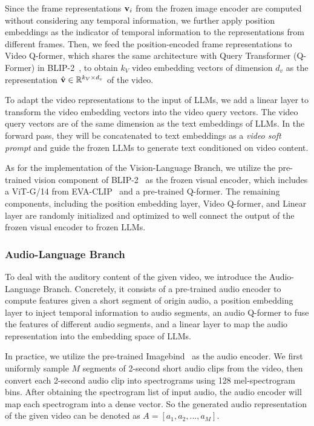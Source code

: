 Since the frame representations $\mathrm{\bf v}_i$ from the frozen image encoder are computed without considering any temporal information, we further apply position embeddings as the indicator of temporal information to the representations from different frames. Then, we feed the position-encoded frame representations to Video Q-former, which shares the same architecture with Query Transformer (Q-Former) in BLIP-2~\citep{li2023blip2bl}, to obtain $k_V$ video embedding vectors of dimension $d_v$ as the representation $\hat{\mathrm{\bf v}} \in \mathbb{R} ^ {k_V \times d_v}$ of the video.

To adapt the video representations to the input of LLMs, we add a linear layer to transform the video embedding vectors into the video query vectors. The video query vectors are of the same dimension as the text embeddings of LLMs. In the forward pass, they will be concatenated to text embeddings as a \textit{video soft prompt} and guide the frozen LLMs to generate text conditioned on video content.

As for the implementation of the Vision-Language Branch, we utilize the pre-trained vision component of BLIP-2~\citep{li2023blip2bl} as the frozen visual encoder, which includes a ViT-G/14 from EVA-CLIP~\citep{fang2022eva} and a pre-trained Q-former. The remaining components, including the position embedding layer, Video Q-former, and Linear layer are randomly initialized and optimized to well connect the output of the frozen visual encoder to frozen LLMs.

\subsubsection{Audio-Language Branch}
To deal with the auditory content of the given video, we introduce the Audio-Language Branch. Concretely, it consists of a pre-trained audio encoder to compute features given a short segment of origin audio, a position embedding layer to inject temporal information to audio segments, an audio Q-former to fuse the features of different audio segments, and a linear layer to map the audio representation into the embedding space of LLMs.

In practice, we utilize the pre-trained Imagebind~\citep{girdhar2023imagebind} as the audio encoder. We first uniformly sample $M$ segments of 2-second short audio clips from the video, then convert each 2-second audio clip into spectrograms using 128 mel-spectrogram bins. After obtaining the spectrogram list of input audio, the audio encoder will map each spectrogram into a dense vector. So the generated audio representation of the given video can be denoted as  $A = [a_1,a_2,...,a_M]$. 

